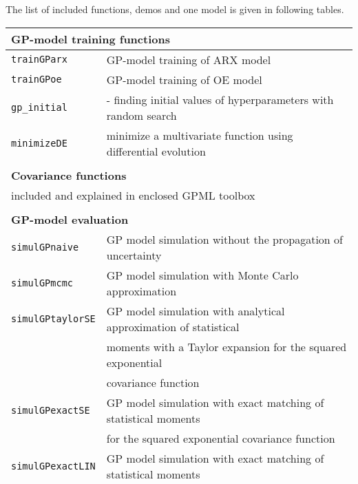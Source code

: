 \documentclass[12pt,twoside]{article}
\newcommand{\fun}[1]{{\tt {#1}}}
\def\tabelarule{\rule[-3mm]{0mm}{10mm}}
\begin{document}
\clearpage

 The list of included functions, demos and one model is given in
 following tables.


{\renewcommand{\arraystretch}{1.1}

\begin{tabular}{|l|l|}
 \hline \multicolumn{2}{|l|}{\tabelarule \bf GP-model training functions}\\
 \hline \fun{trainGParx} & GP-model training of ARX model \\
 \hline \fun{trainGPoe} & GP-model training of OE model \\
 \hline \fun{gp\_initial} & - finding initial values of hyperparameters with random search  \\
  \hline \fun{minimizeDE} & minimize a multivariate function using differential evolution \\
  \hline
%
%
\multicolumn{2}{l}{\tabelarule \bf } \\ \hline
\multicolumn{2}{|l|}{\tabelarule \bf Covariance functions} \\
\multicolumn{2}{|l|}{\tabelarule included and explained in enclosed GPML
toolbox} \\ \hline
%
%
 \multicolumn{2}{l}{\tabelarule \bf } \\
 \hline \multicolumn{2}{|l|}{\tabelarule \bf GP-model evaluation} \\
 \hline \fun{simulGPnaive} & GP model simulation without the propagation of uncertainty \\
 \hline \fun{simulGPmcmc} & GP model simulation with Monte Carlo approximation\\
 \hline \fun{simulGPtaylorSE} & GP model simulation with analytical approximation of statistical\\
 & moments with a Taylor expansion for the squared exponential\\
 & covariance function\\
 \hline \fun{simulGPexactSE} & GP model simulation with exact matching of statistical moments\\
 &for the squared exponential covariance function \\
 \hline \fun{simulGPexactLIN} & GP model simulation with exact matching of statistical moments\\
 &for the linear covariance function \\
 \hline \fun{predGPnaive} & multi-step-ahead prediction of GP model without\\

\end{tabular}}
\end{document}
